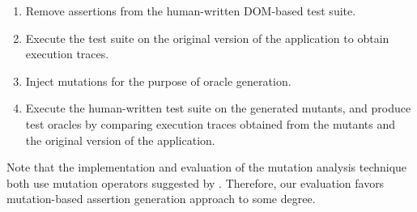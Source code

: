 \begin{enumerate}
\item Remove assertions from the human-written DOM-based test suite.
\item Execute the test suite on the original version of the application to obtain execution traces.
\item Inject mutations for the purpose of oracle generation.
\item Execute the human-written test suite on the generated mutants, and produce test oracles by comparing execution traces obtained from the mutants and the original version of the application.
\end{enumerate}
Note that the implementation and evaluation of the mutation analysis technique both use mutation operators suggested by \cite{mirshokraie:tse15}. Therefore, our evaluation favors mutation-based assertion generation approach to some degree.
 

